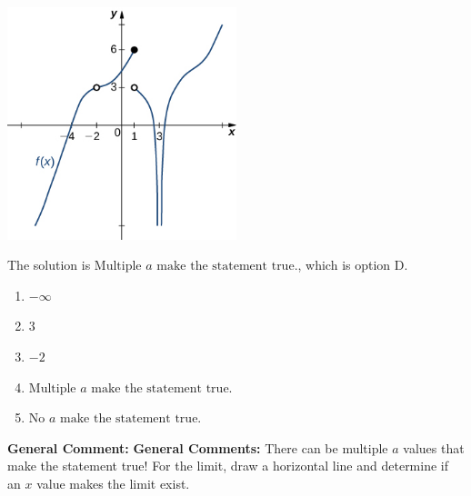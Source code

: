 \documentclass{extbook}[14pt]
\begin{document}
\begin{enumerate}
{\begin{center}
    \includegraphics[width=0.5\textwidth]{../Figures/evaluateLimitGraphicallyC.png}
\end{center}


The solution is \( \text{Multiple } a \text{ make the statement true}. \), which is option D.\begin{enumerate}[label=\Alph*.]
\item \( -\infty \)


\item \( 3 \)


\item \( -2 \)


\item \( \text{Multiple } a \text{ make the statement true}. \)


\item \( \text{No } a \text{ make the statement true}. \)


\end{enumerate}

\textbf{General Comment:} \textbf{General Comments:} There can be multiple $a$ values that make the statement true! For the limit, draw a horizontal line and determine if an $x$ value makes the limit exist.
}
\end{enumerate}
\end{document}
